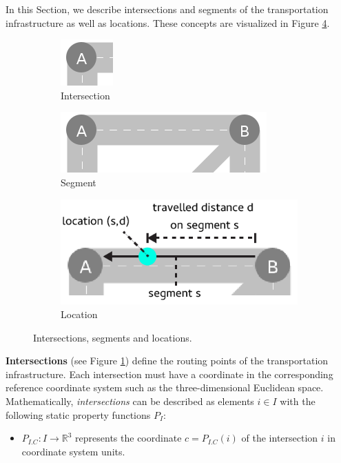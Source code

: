 \documentclass[graybox]{svmult}
\begin{document}
In this Section, we describe intersections and segments of the transportation infrastructure as well as locations. These concepts are visualized in Figure \ref{fig:intersections-segments}.

\begin{figure}[htbp]
	\begin{subfigure}{.3\textwidth}
		\centering
		\includegraphics[scale=0.4]{../../concepts/intersection.png}
		\caption{Intersection}
		\label{fig:intersection}
	\end{subfigure}
	\hfill
	\begin{subfigure}{.3\textwidth}
		\centering
		\includegraphics[scale=0.4]{../../concepts/segment.png}
		\caption{Segment}
		\label{fig:segment}
	\end{subfigure}
	\hfill
		\begin{subfigure}{.3\textwidth}
		\centering
		\includegraphics[scale=0.4]{../../concepts/location.png}
		\caption{Location}
		\label{fig:location}
	\end{subfigure}
    \hfill
	\caption{Intersections, segments and locations.}
	\label{fig:intersections-segments}	
\end{figure}

\noindent \textbf{Intersections} (see Figure \ref{fig:intersection}) define the routing points of the transportation infrastructure.
Each intersection must have a coordinate in the corresponding reference coordinate system such as the three-dimensional Euclidean space.
Mathematically, \textit{intersections} can be described as elements $i \in I$ with the following static property functions $P_{I}$:
\begin{itemize}
	\item $P_{I.C}: I \rightarrow \mathbb{R}^3$ represents the coordinate $c = P_{I.C}(i)$ of the intersection $i$ in coordinate system units.
\end{itemize}
\end{document}
